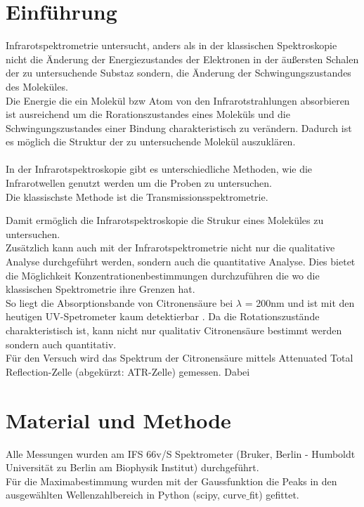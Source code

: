 \documentclass[10pt,a4paper]{article}
\begin{document}
	\section{Einführung}	
	Infrarotspektrometrie untersucht, anders als in der klassischen Spektroskopie nicht die Änderung der Energiezustandes der Elektronen in der äußersten Schalen der zu untersuchende Substaz sondern, die Änderung der Schwingungszustandes des Moleküles.\\
	Die Energie die ein Molekül bzw Atom von den Infrarotstrahlungen absorbieren ist ausreichend um die Rorationszustandes eines Moleküls und die Schwingungszustandes einer Bindung charakteristisch zu verändern.
	Dadurch ist es möglich die Struktur der zu untersuchende Molekül auszuklären.\\
	\\
	In der Infrarotspektroskopie gibt es unterschiedliche Methoden, wie die Infrarotwellen genutzt werden um die Proben zu untersuchen.\\
	Die klassischste Methode ist die Transmissionsspektrometrie.
	
	
	
	Damit ermöglich die Infrarotspektroskopie die Strukur eines Moleküles zu untersuchen.\\
	Zusätzlich kann auch mit der Infrarotspektrometrie nicht nur die qualitative Analyse durchgeführt werden, sondern auch die quantitative Analyse. Dies bietet die Möglichkeit Konzentrationenbestimmungen durchzuführen die wo die klassischen Spektrometrie ihre Grenzen hat.\\
	So liegt die Absorptionsbande von Citronensäure bei $\lambda$ = 200nm und ist mit den heutigen UV-Spetrometer kaum detektierbar \cite{Citricacid_UV}. Da die Rotationszustände charakteristisch ist, kann nicht nur qualitativ Citronensäure bestimmt werden sondern auch quantitativ.\\
	Für den Versuch wird das Spektrum der Citronensäure mittels Attenuated Total Reflection-Zelle (abgekürzt: ATR-Zelle) gemessen. Dabei 
	
	
	
	
	
	
	
	
	
	\section{Material und Methode}
	Alle Messungen wurden am IFS 66v/S Spektrometer (Bruker, Berlin - Humboldt Universität zu Berlin am Biophysik Institut) durchgeführt.\\
	Für die Maximabestimmung wurden mit der Gaussfunktion die Peaks in den ausgewählten Wellenzahlbereich in Python (scipy, curve$\_$fit) gefittet.
	
\end{document}

